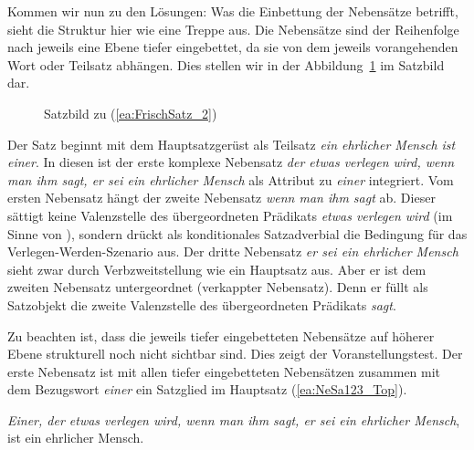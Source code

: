 Kommen wir nun zu den Lösungen: Was die Einbettung der Nebensätze betrifft, sieht die Struktur hier wie eine Treppe aus. Die Nebensätze sind der Reihenfolge nach jeweils eine Ebene tiefer eingebettet, da sie von dem jeweils vorangehenden Wort oder Teilsatz abhängen. Dies stellen wir in der Abbildung~\ref{Abb:Satzbild_Frisch} im Satzbild dar.

\begin{figure}
    \centering
    
    \caption{Satzbild zu (\ref{ea:FrischSatz_2})}
    \label{Abb:Satzbild_Frisch}
\end{figure}

Der Satz beginnt mit dem Hauptsatzgerüst als Teilsatz \textit{ein ehrlicher Mensch ist einer}. In diesen ist der erste komplexe Nebensatz \textit{der etwas verlegen wird, wenn man ihm sagt, er sei ein ehrlicher Mensch} als Attribut zu \textit{einer} integriert. Vom ersten Nebensatz hängt der zweite Nebensatz \textit{wenn man ihm sagt} ab. Dieser sättigt keine Valenzstelle des übergeordneten Prädikats \textit{etwas verlegen wird} (im Sinne von ), sondern drückt als konditionales Satzadverbial die Bedingung für das Verlegen-Werden-Szenario aus. Der dritte Nebensatz \textit{er sei ein ehrlicher Mensch} sieht zwar durch Verbzweitstellung wie ein Hauptsatz aus. Aber er ist dem zweiten Nebensatz untergeordnet (verkappter Nebensatz). Denn er füllt als Satzobjekt die zweite Valenzstelle des übergeordneten Prädikats \textit{sagt}. 

Zu beachten ist, dass die jeweils tiefer eingebetteten Nebensätze auf höherer Ebene strukturell noch nicht sichtbar sind. Dies zeigt der Voranstellungstest. Der erste Nebensatz ist mit allen tiefer eingebetteten Nebensätzen zusammen mit dem Bezugswort \textit{einer} ein Satzglied im Hauptsatz (\ref{ea:NeSa123_Top}).

\ea \label{ea:NeSa123_Top} \textit{Einer, der etwas verlegen wird, wenn man ihm sagt, er sei ein ehrlicher Mensch}, ist ein ehrlicher Mensch.
\z 


